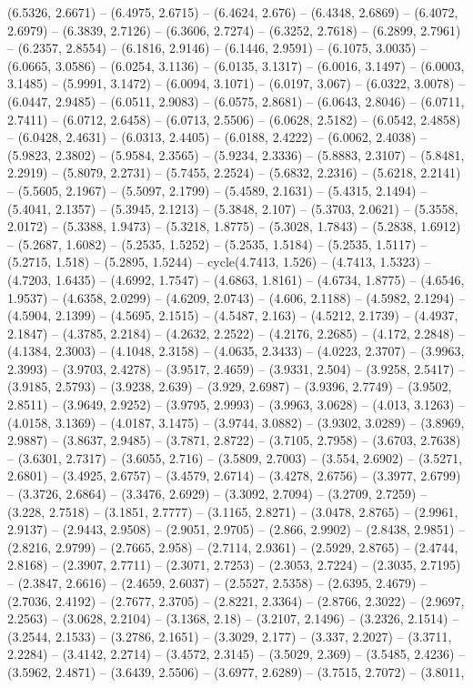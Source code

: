 (6.5326, 2.6671) -- (6.4975, 2.6715) -- (6.4624, 2.676) -- (6.4348, 2.6869) -- (6.4072, 2.6979) -- (6.3839, 2.7126) -- (6.3606, 2.7274) -- (6.3252, 2.7618) -- (6.2899, 2.7961) -- (6.2357, 2.8554) -- (6.1816, 2.9146) -- (6.1446, 2.9591) -- (6.1075, 3.0035) -- (6.0665, 3.0586) -- (6.0254, 3.1136) -- (6.0135, 3.1317) -- (6.0016, 3.1497) -- (6.0003, 3.1485) -- (5.9991, 3.1472) -- (6.0094, 3.1071) -- (6.0197, 3.067) -- (6.0322, 3.0078) -- (6.0447, 2.9485) -- (6.0511, 2.9083) -- (6.0575, 2.8681) -- (6.0643, 2.8046) -- (6.0711, 2.7411) -- (6.0712, 2.6458) -- (6.0713, 2.5506) -- (6.0628, 2.5182) -- (6.0542, 2.4858) -- (6.0428, 2.4631) -- (6.0313, 2.4405) -- (6.0188, 2.4222) -- (6.0062, 2.4038) -- (5.9823, 2.3802) -- (5.9584, 2.3565) -- (5.9234, 2.3336) -- (5.8883, 2.3107) -- (5.8481, 2.2919) -- (5.8079, 2.2731) -- (5.7455, 2.2524) -- (5.6832, 2.2316) -- (5.6218, 2.2141) -- (5.5605, 2.1967) -- (5.5097, 2.1799) -- (5.4589, 2.1631) -- (5.4315, 2.1494) -- (5.4041, 2.1357) -- (5.3945, 2.1213) -- (5.3848, 2.107) -- (5.3703, 2.0621) -- (5.3558, 2.0172) -- (5.3388, 1.9473) -- (5.3218, 1.8775) -- (5.3028, 1.7843) -- (5.2838, 1.6912) -- (5.2687, 1.6082) -- (5.2535, 1.5252) -- (5.2535, 1.5184) -- (5.2535, 1.5117) -- (5.2715, 1.518) -- (5.2895, 1.5244) -- cycle(4.7413, 1.526) -- (4.7413, 1.5323) -- (4.7203, 1.6435) -- (4.6992, 1.7547) -- (4.6863, 1.8161) -- (4.6734, 1.8775) -- (4.6546, 1.9537) -- (4.6358, 2.0299) -- (4.6209, 2.0743) -- (4.606, 2.1188) -- (4.5982, 2.1294) -- (4.5904, 2.1399) -- (4.5695, 2.1515) -- (4.5487, 2.163) -- (4.5212, 2.1739) -- (4.4937, 2.1847) -- (4.3785, 2.2184) -- (4.2632, 2.2522) -- (4.2176, 2.2685) -- (4.172, 2.2848) -- (4.1384, 2.3003) -- (4.1048, 2.3158) -- (4.0635, 2.3433) -- (4.0223, 2.3707) -- (3.9963, 2.3993) -- (3.9703, 2.4278) -- (3.9517, 2.4659) -- (3.9331, 2.504) -- (3.9258, 2.5417) -- (3.9185, 2.5793) -- (3.9238, 2.639) -- (3.929, 2.6987) -- (3.9396, 2.7749) -- (3.9502, 2.8511) -- (3.9649, 2.9252) -- (3.9795, 2.9993) -- (3.9963, 3.0628) -- (4.013, 3.1263) -- (4.0158, 3.1369) -- (4.0187, 3.1475) -- (3.9744, 3.0882) -- (3.9302, 3.0289) -- (3.8969, 2.9887) -- (3.8637, 2.9485) -- (3.7871, 2.8722) -- (3.7105, 2.7958) -- (3.6703, 2.7638) -- (3.6301, 2.7317) -- (3.6055, 2.716) -- (3.5809, 2.7003) -- (3.554, 2.6902) -- (3.5271, 2.6801) -- (3.4925, 2.6757) -- (3.4579, 2.6714) -- (3.4278, 2.6756) -- (3.3977, 2.6799) -- (3.3726, 2.6864) -- (3.3476, 2.6929) -- (3.3092, 2.7094) -- (3.2709, 2.7259) -- (3.228, 2.7518) -- (3.1851, 2.7777) -- (3.1165, 2.8271) -- (3.0478, 2.8765) -- (2.9961, 2.9137) -- (2.9443, 2.9508) -- (2.9051, 2.9705) -- (2.866, 2.9902) -- (2.8438, 2.9851) -- (2.8216, 2.9799) -- (2.7665, 2.958) -- (2.7114, 2.9361) -- (2.5929, 2.8765) -- (2.4744, 2.8168) -- (2.3907, 2.7711) -- (2.3071, 2.7253) -- (2.3053, 2.7224) -- (2.3035, 2.7195) -- (2.3847, 2.6616) -- (2.4659, 2.6037) -- (2.5527, 2.5358) -- (2.6395, 2.4679) -- (2.7036, 2.4192) -- (2.7677, 2.3705) -- (2.8221, 2.3364) -- (2.8766, 2.3022) -- (2.9697, 2.2563) -- (3.0628, 2.2104) -- (3.1368, 2.18) -- (3.2107, 2.1496) -- (3.2326, 2.1514) -- (3.2544, 2.1533) -- (3.2786, 2.1651) -- (3.3029, 2.177) -- (3.337, 2.2027) -- (3.3711, 2.2284) -- (3.4142, 2.2714) -- (3.4572, 2.3145) -- (3.5029, 2.369) -- (3.5485, 2.4236) -- (3.5962, 2.4871) -- (3.6439, 2.5506) -- (3.6977, 2.6289) -- (3.7515, 2.7072) -- (3.8011, 